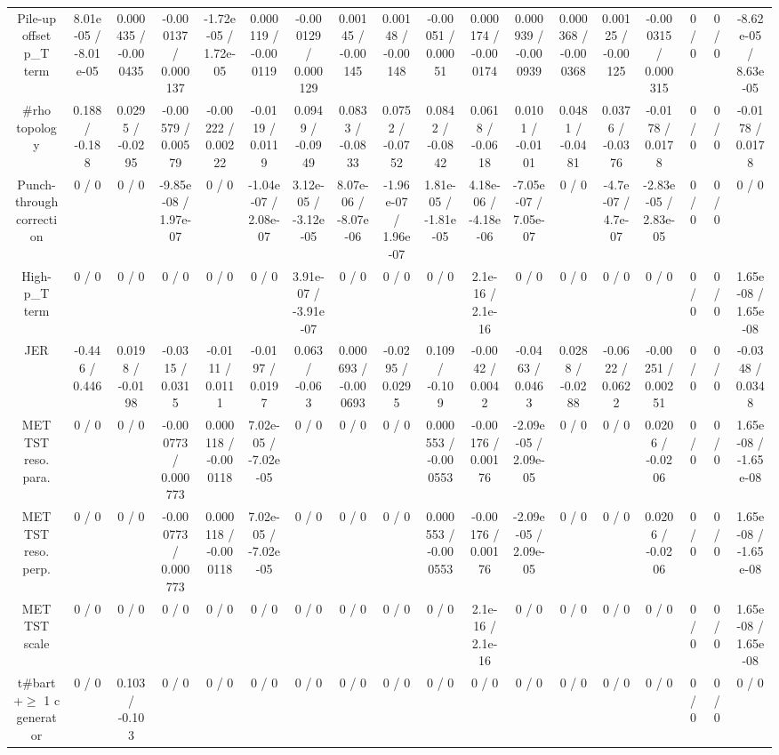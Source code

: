 \documentclass[10pt]{article}
\begin{document}
\begin{table}[htbp]
\begin{center}
\begin{tabular}{|c|c|c|c|c|c|c|c|c|c|c|c|c|c|c|c|c|c|}
  Pile-up offset p_{T} term & 8.01e-05 / -8.01e-05 & 0.000435 / -0.000435 & -0.000137 / 0.000137 & -1.72e-05 / 1.72e-05 & 0.000119 / -0.000119 & -0.000129 / 0.000129 & 0.00145 / -0.00145 & 0.00148 / -0.00148 & -0.00051 / 0.00051 & 0.000174 / -0.000174 & 0.000939 / -0.000939 & 0.000368 / -0.000368 & 0.00125 / -0.00125 & -0.000315 / 0.000315 & 0 / 0 & 0 / 0 & -8.62e-05 / 8.63e-05 \\ 
  #rho topology & 0.188 / -0.188 & 0.0295 / -0.0295 & -0.00579 / 0.00579 & -0.00222 / 0.00222 & -0.0119 / 0.0119 & 0.0949 / -0.0949 & 0.0833 / -0.0833 & 0.0752 / -0.0752 & 0.0842 / -0.0842 & 0.0618 / -0.0618 & 0.0101 / -0.0101 & 0.0481 / -0.0481 & 0.0376 / -0.0376 & -0.0178 / 0.0178 & 0 / 0 & 0 / 0 & -0.0178 / 0.0178 \\ 
  Punch-through correction & 0 / 0 & 0 / 0 & -9.85e-08 / 1.97e-07 & 0 / 0 & -1.04e-07 / 2.08e-07 & 3.12e-05 / -3.12e-05 & 8.07e-06 / -8.07e-06 & -1.96e-07 / 1.96e-07 & 1.81e-05 / -1.81e-05 & 4.18e-06 / -4.18e-06 & -7.05e-07 / 7.05e-07 & 0 / 0 & -4.7e-07 / 4.7e-07 & -2.83e-05 / 2.83e-05 & 0 / 0 & 0 / 0 & 0 / 0 \\ 
  High-p_{T} term & 0 / 0 & 0 / 0 & 0 / 0 & 0 / 0 & 0 / 0 & 3.91e-07 / -3.91e-07 & 0 / 0 & 0 / 0 & 0 / 0 & 2.1e-16 / 2.1e-16 & 0 / 0 & 0 / 0 & 0 / 0 & 0 / 0 & 0 / 0 & 0 / 0 & 1.65e-08 / 1.65e-08 \\ 
  JER & -0.446 / 0.446 & 0.0198 / -0.0198 & -0.0315 / 0.0315 & -0.0111 / 0.0111 & -0.0197 / 0.0197 & 0.063 / -0.063 & 0.000693 / -0.000693 & -0.0295 / 0.0295 & 0.109 / -0.109 & -0.0042 / 0.0042 & -0.0463 / 0.0463 & 0.0288 / -0.0288 & -0.0622 / 0.0622 & -0.00251 / 0.00251 & 0 / 0 & 0 / 0 & -0.0348 / 0.0348 \\ 
  MET TST reso. para. & 0 / 0 & 0 / 0 & -0.000773 / 0.000773 & 0.000118 / -0.000118 & 7.02e-05 / -7.02e-05 & 0 / 0 & 0 / 0 & 0 / 0 & 0.000553 / -0.000553 & -0.00176 / 0.00176 & -2.09e-05 / 2.09e-05 & 0 / 0 & 0 / 0 & 0.0206 / -0.0206 & 0 / 0 & 0 / 0 & 1.65e-08 / -1.65e-08 \\ 
  MET TST reso. perp. & 0 / 0 & 0 / 0 & -0.000773 / 0.000773 & 0.000118 / -0.000118 & 7.02e-05 / -7.02e-05 & 0 / 0 & 0 / 0 & 0 / 0 & 0.000553 / -0.000553 & -0.00176 / 0.00176 & -2.09e-05 / 2.09e-05 & 0 / 0 & 0 / 0 & 0.0206 / -0.0206 & 0 / 0 & 0 / 0 & 1.65e-08 / -1.65e-08 \\ 
  MET TST scale & 0 / 0 & 0 / 0 & 0 / 0 & 0 / 0 & 0 / 0 & 0 / 0 & 0 / 0 & 0 / 0 & 0 / 0 & 2.1e-16 / 2.1e-16 & 0 / 0 & 0 / 0 & 0 / 0 & 0 / 0 & 0 / 0 & 0 / 0 & 1.65e-08 / 1.65e-08 \\ 
  t#bar{t}+$\geq$ 1 c generator & 0 / 0 & 0.103 / -0.103 & 0 / 0 & 0 / 0 & 0 / 0 & 0 / 0 & 0 / 0 & 0 / 0 & 0 / 0 & 0 / 0 & 0 / 0 & 0 / 0 & 0 / 0 & 0 / 0 & 0 / 0 & 0 / 0 & 0 / 0 \\ 

\end{tabular}
\end{center}
\end{table}
\end{document}

